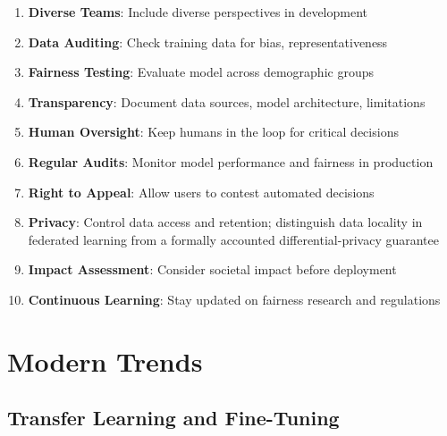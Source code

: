 \documentclass[11pt,twoside]{article}
\numberwithin{equation}{section}
\theoremstyle{plain}
\theoremstyle{definition}
\theoremstyle{remark}
\begin{document}
\begin{tcolorbox}[colback=red!5!white,colframe=red!75!black,title=Guidelines for Ethical ML]
\begin{enumerate}
\item \textbf{Diverse Teams}: Include diverse perspectives in development

\item \textbf{Data Auditing}: Check training data for bias, representativeness

\item \textbf{Fairness Testing}: Evaluate model across demographic groups

\item \textbf{Transparency}: Document data sources, model architecture, limitations

\item \textbf{Human Oversight}: Keep humans in the loop for critical decisions

\item \textbf{Regular Audits}: Monitor model performance and fairness in production

\item \textbf{Right to Appeal}: Allow users to contest automated decisions

\item \textbf{Privacy}: Control data access and retention; distinguish data locality in federated learning from a formally accounted differential-privacy guarantee

\item \textbf{Impact Assessment}: Consider societal impact before deployment

\item \textbf{Continuous Learning}: Stay updated on fairness research and regulations
\end{enumerate}
\end{tcolorbox}

\section{Modern Trends}
\label{sec:modern-trends}

\subsection{Transfer Learning and Fine-Tuning}
\end{document}
